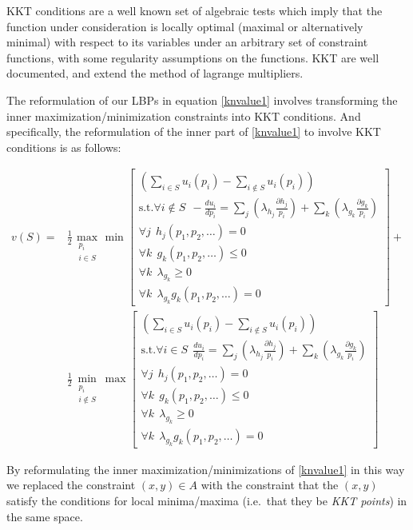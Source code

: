 KKT conditions are a well known set of algebraic tests which imply that the function under consideration is locally optimal (maximal or alternatively minimal) with respect to its variables under an arbitrary set of constraint functions, with some regularity assumptions on the functions.
KKT are well documented, and extend the method of lagrange multipliers.

The reformulation of our LBPs in equation \ref{knvalue1} involves transforming the inner maximization/minimization constraints into KKT conditions.
And specifically, the reformulation of the inner part of \eqref{knvalue1} to involve KKT conditions is as follows:

\begin{equation}
\label{kkt_optimization1}
\begin{aligned}
v(S) =& 
\frac{1}{2}\max_{\substack{p_i \\ i\in S}}\min\left[\substack{
	\left(\sum_{i\in S}u_i(p_i) - \sum_{i\notin S}u_i(p_i)\right)\\
	\text{s.t.}\forall i\notin S~~-\frac{d u_i}{d p_i}=\sum_j(\lambda_{h_j}\frac{\partial h_j}{p_i}) + \sum_k(\lambda_{g_k}\frac{\partial g_k}{p_i})\\
	\forall j~~ h_j(p_1,p_2,\dots)=0\\
	\forall k~~ g_k(p_1,p_2,\dots)\le 0\\
	\forall k~~ \lambda_{g_k} \ge 0\\
	\forall k~~ \lambda_{g_k}g_k(p_1,p_2,\dots)= 0}
\right] +\\
&\frac{1}{2}\min_{\substack{p_i \\ i\notin S}}\max\left[\substack{
	\left(\sum_{i\in S}u_i(p_i) - \sum_{i\notin S}u_i(p_i)\right)\\
	\text{s.t.}\forall i\in S~~\frac{d u_i}{d p_i}=\sum_j(\lambda_{h_j}\frac{\partial h_j}{p_i}) + \sum_k(\lambda_{g_k}\frac{\partial g_k}{p_i})\\
	\forall j~~ h_j(p_1,p_2,\dots)=0\\
	\forall k~~ g_k(p_1,p_2,\dots)\le 0\\
	\forall k~~ \lambda_{g_k} \ge 0\\
	\forall k~~ \lambda_{g_k}g_k(p_1,p_2,\dots)= 0}
\right]
\end{aligned}
\end{equation}

By reformulating the inner maximization/minimizations of \eqref{knvalue1} in this way we replaced the constraint $(x,y)\in A$ with 
the constraint that the $(x,y)$ satisfy the conditions for local minima/maxima (i.e.\ that they be \emph{KKT points}) in 
the same space.%

